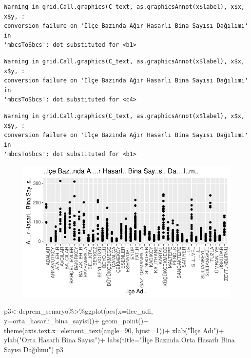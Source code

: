 \documentclass[
  11pt,
  a4paper,
  DIV=11,
  numbers=noendperiod]{scrartcl}
\newenvironment{Shaded}{\begin{snugshade}}{\end{snugshade}}
\newcommand{\AttributeTok}[1]{\textcolor[rgb]{0.40,0.45,0.13}{#1}}
\newcommand{\DecValTok}[1]{\textcolor[rgb]{0.68,0.00,0.00}{#1}}
\newcommand{\FunctionTok}[1]{\textcolor[rgb]{0.28,0.35,0.67}{#1}}
\newcommand{\NormalTok}[1]{\textcolor[rgb]{0.00,0.23,0.31}{#1}}
\newcommand{\OtherTok}[1]{\textcolor[rgb]{0.00,0.23,0.31}{#1}}
\newcommand{\SpecialCharTok}[1]{\textcolor[rgb]{0.37,0.37,0.37}{#1}}
\newcommand{\StringTok}[1]{\textcolor[rgb]{0.13,0.47,0.30}{#1}}
\begin{document}
\begin{verbatim}
Warning in grid.Call.graphics(C_text, as.graphicsAnnot(x$label), x$x, x$y, :
conversion failure on 'İlçe Bazında Ağır Hasarlı Bina Sayısı Dağılımı' in
'mbcsToSbcs': dot substituted for <b1>
\end{verbatim}

\begin{verbatim}
Warning in grid.Call.graphics(C_text, as.graphicsAnnot(x$label), x$x, x$y, :
conversion failure on 'İlçe Bazında Ağır Hasarlı Bina Sayısı Dağılımı' in
'mbcsToSbcs': dot substituted for <c4>
\end{verbatim}

\begin{verbatim}
Warning in grid.Call.graphics(C_text, as.graphicsAnnot(x$label), x$x, x$y, :
conversion failure on 'İlçe Bazında Ağır Hasarlı Bina Sayısı Dağılımı' in
'mbcsToSbcs': dot substituted for <b1>
\end{verbatim}

\begin{figure}[H]

{\centering \includegraphics{project_files/figure-pdf/unnamed-chunk-3-2.pdf}

}

\end{figure}

\begin{Shaded}
\begin{Highlighting}[]
\NormalTok{p3}\OtherTok{\textless{}{-}}\NormalTok{deprem\_senaryo}\SpecialCharTok{\%\textgreater{}\%}\FunctionTok{ggplot}\NormalTok{(}\FunctionTok{aes}\NormalTok{(}\AttributeTok{x=}\NormalTok{ilce\_adi, }\AttributeTok{y=}\NormalTok{orta\_hasarli\_bina\_sayisi))}\SpecialCharTok{+}
  \FunctionTok{geom\_point}\NormalTok{()}\SpecialCharTok{+}
  \FunctionTok{theme}\NormalTok{(}\AttributeTok{axis.text.x=}\FunctionTok{element\_text}\NormalTok{(}\AttributeTok{angle=}\DecValTok{90}\NormalTok{, }\AttributeTok{hjust=}\DecValTok{1}\NormalTok{))}\SpecialCharTok{+}
  \FunctionTok{xlab}\NormalTok{(}\StringTok{"İlçe Adı"}\NormalTok{)}\SpecialCharTok{+}
  \FunctionTok{ylab}\NormalTok{(}\StringTok{"Orta Hasarlı Bina Sayısı"}\NormalTok{)}\SpecialCharTok{+}
  \FunctionTok{labs}\NormalTok{(}\AttributeTok{title=}\StringTok{"İlçe Bazında Orta Hasarlı Bina Sayısı Dağılımı"}\NormalTok{)}
\NormalTok{p3}
\end{Highlighting}
\end{Shaded}
\end{document}
